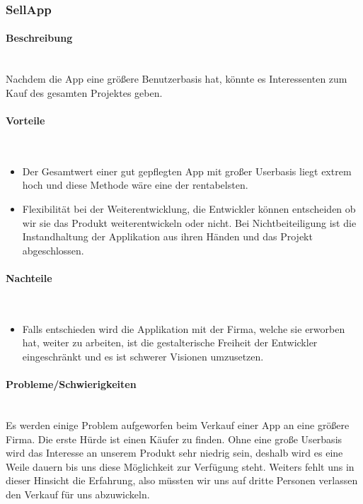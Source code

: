 \documentclass[FIPLY_base.tex]{subfiles}
\begin{document}
\subsubsection{SellApp}


\paragraph{Beschreibung}\ \\
Nachdem die App eine größere Benutzerbasis hat, könnte es Interessenten zum Kauf des gesamten Projektes geben.


\paragraph{Vorteile}\ \\
\begin{itemize}
\item Der Gesamtwert einer gut gepflegten App mit großer Userbasis liegt extrem hoch und diese Methode wäre eine der rentabelsten.
\item Flexibilität bei der Weiterentwicklung, die Entwickler können entscheiden ob wir sie das Produkt weiterentwickeln oder nicht. Bei Nichtbeiteiligung ist die Instandhaltung der Applikation aus ihren Händen und das Projekt abgeschlossen.
\end{itemize}

\paragraph{Nachteile}\ \\
\begin{itemize}
\item Falls entschieden wird die Applikation mit der Firma, welche sie erworben hat, weiter zu arbeiten, ist die gestalterische Freiheit der Entwickler eingeschränkt und es ist schwerer Visionen umzusetzen.
\end{itemize}


\paragraph{Probleme/Schwierigkeiten}\ \\
Es werden einige Problem aufgeworfen beim Verkauf einer App an eine größere Firma. Die erste Hürde ist einen Käufer zu finden.
Ohne eine große Userbasis wird das Interesse an unserem Produkt sehr niedrig sein, deshalb wird es eine Weile dauern bis uns diese Möglichkeit zur Verfügung steht.
Weiters fehlt uns in dieser Hinsicht die Erfahrung, also müssten wir uns auf dritte Personen verlassen den Verkauf für uns abzuwickeln.
\end{document}
